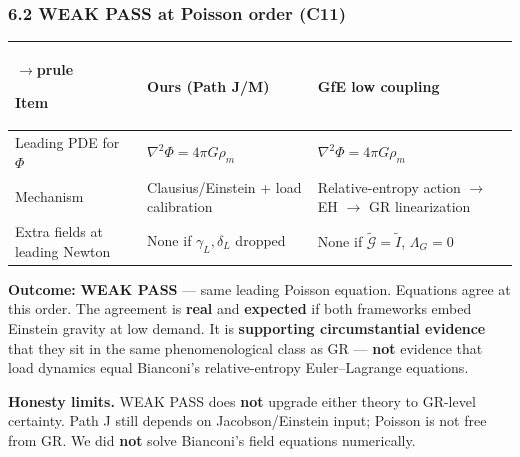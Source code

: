 \documentclass[
  11pt,
]{article}
\newcounter{none} %
\begin{document}
\subsubsection{\texorpdfstring{6.2 WEAK PASS at Poisson order (\textbf{C11})}{6.2 WEAK PASS at Poisson order (C11)}}\label{weak-pass-at-poisson-order-c11}

{\def\LTcaptype{none} %
\begin{longtable}[]{@{}
  >{\raggedright\arraybackslash}p{}
  >{\raggedright\arraybackslash}p{}
  >{\raggedright\arraybackslash}p{}@{}}
$\rightarrow$prule\noalign{}
\begin{minipage}[b]{\linewidth}\raggedright
Item
\end{minipage} & \begin{minipage}[b]{\linewidth}\raggedright
Ours (Path J/M)
\end{minipage} & \begin{minipage}[b]{\linewidth}\raggedright
GfE low coupling
\end{minipage} \\
\midrule\noalign{}
\endhead
\bottomrule\noalign{}
\endlastfoot
Leading PDE for \(\Phi\) & \(\nabla^2\Phi=4\pi G\rho_m\) & \(\nabla^2\Phi=4\pi G\rho_m\) \\
Mechanism & Clausius/Einstein + load calibration & Relative-entropy action $\rightarrow$ EH $\rightarrow$ GR linearization \\
Extra fields at leading Newton & None if \(\gamma_L,\delta_L\) dropped & None if \(\tilde{\mathcal{G}}=\tilde I\), \(\Lambda_G=0\) \\
\end{longtable}
}

\textbf{Outcome:} \textbf{WEAK PASS} --- same leading Poisson equation. Equations agree at this order. The agreement is \textbf{real} and \textbf{expected} if both frameworks embed Einstein gravity at low demand. It is \textbf{supporting circumstantial evidence} that they sit in the same phenomenological class as GR --- \textbf{not} evidence that load dynamics equal Bianconi's relative-entropy Euler--Lagrange equations.

\textbf{Honesty limits.} WEAK PASS does \textbf{not} upgrade either theory to GR-level certainty. Path J still depends on Jacobson/Einstein input; Poisson is not free from GR. We did \textbf{not} solve Bianconi's field equations numerically.
\end{document}
